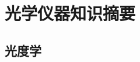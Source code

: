 \chapter{光学仪器知识摘要}

\begin{comment}
我们暂时不讨论光的干涉与衍射,\,故暂时不太需要光的波动理论.\,但实际上到了实用的层面上,\,各个光学仪器,\,从原理上说尽管几乎只用到几何光学的内容,\,似乎也是避不开对光的强度的讨论的.\,故本章先对在光的波动学说成型之前就已经蓬勃发展起来的\emph{光度学}(photometry)进行说明.\,然后从若干方面对实用频率最高的一些光学仪器做未免以偏概全的介绍.
\end{comment}


\section{光度学}

\begin{comment}
光源产生的光,\,在光学系统中可能被光学仪器最终接收,\,如\emph{光电二极管}(photodiode),\,\emph{电荷耦合元件}(charge-coupled device,\,CCD)等.\,也可以直接被人眼所直接观察.\,很明显,\,不同仪器作为探测仪器用时,\,其光谱响应将存在很大的区别.\,然而,\,既然是光学,\,从古到今仪器的设计都是围绕人的视觉展开.\,即最核心的波段是可见光波段.\,只是,\,随着科技的发展,\,眼睛的作用逐渐被物理仪器所替代,\,对光的探测也逐渐融入了更大范围的对电磁辐射的探测中,\,后者即\emph{辐射度量学}(radiometry).\,比如当今天体物理中用到的各种探测手段,\,从波长最长的关于宇宙微波背景的射电探测,\,到波长最短的中子星$\gamma$射线暴的探测,\,俨然不再是古人仰观星空可以达到的广度和深度.\,辐射度量学以能量作为最基本的物理量进行测量,\,单位就是焦耳,\,$\mathrm{J}$.\,但是如果是考虑日常生活中以人眼视觉为核心设计的各类照明,\,媒体灯光,\,红外线,\,紫外线以外的波段几乎就被我们排除在外.\,在此之前我们需要先对人眼的独特的色视觉做一个了解:

\subsection{色视觉}
\begin{wrapfigure}[10]{o}[-10pt]{8cm}
\centering
\texttt{[image: image/5-8-1.png]}
\caption{四钟感光细胞相对响应}
\end{wrapfigure}
大部分人类的视网膜内有两种大类的视觉感受细胞:\,\emph{视锥细胞}(cone)与\emph{视杆细胞}(rod).\,而视锥细胞又根据其所含视蛋白质分为感受$500-700\mathrm{nm}$波长的\emph{视红素}细胞(protan,\,erythrolabe,\,L,\,$\rho$);\,感受$450-630\mathrm{nm}$波长的\emph{视绿素}细胞(deutan,\,chlorolabe,\,M,\,$\gamma$)和感受$400-500\mathrm{nm}$波长的\emph{视蓝素}细胞(tritan,\,cyanolabe,\,S,\,$\beta$)\footnote{在女性中常见异常X染色体导致个体产生四种色素的视锥细胞从而其色视觉明显优于一般的男性或女性}.\,
\end{comment}



